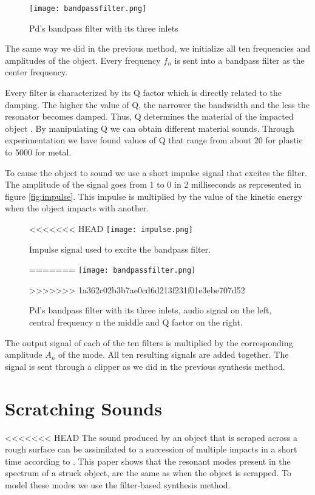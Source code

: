 \begin{figure}[H]
  \centering
    \texttt{[image: bandpassfilter.png]}
      \caption{Pd's bandpass filter with its three inlets}
      \label{fig:pdbandpass}
\end{figure} 

The same way we did in the previous method, we initialize all ten frequencies and amplitudes of the object. Every frequency $f_n$ is sent into a bandpass filter as the center frequency. 

Every filter is characterized by its Q factor which is directly related to the damping. The higher the value of Q, the narrower the bandwidth and the less the resonator becomes damped. Thus, Q determines the material of the impacted object \cite{gaver1993we}. By manipulating Q we can obtain different material sounds. Through experimentation we have found values of Q that range from about 20 for plastic to 5000 for metal. 

To cause the object to sound we use a short impulse signal that excites the filter. The amplitude of the signal goes from 1 to 0 in 2 milliseconds as represented in figure \ref{fig:impulse}. This impulse is multiplied by the value of the kinetic energy when the object impacts with another. 

\begin{figure}[H]
  \centering
<<<<<<< HEAD
    \texttt{[image: impulse.png]}
      \caption{Impulse signal used to excite the bandpass filter.}
      \label{fig:impulse}
=======
    \texttt{[image: bandpassfilter.png]}
      \caption{Pd's bandpass filter with its three inlets, audio signal on the left, central frequency n the middle and Q factor on the right.}
      \label{fig:bpf}
>>>>>>> 1a362c02b3b7ae0cd6d213f231f01e3ebe707d52
\end{figure} 

The output signal of each of the ten filters is multiplied by the corresponding amplitude $A_n$ of the mode. All ten resulting signals are added together. The signal is sent through a clipper as we did in the previous synthesis method.

\section{Scratching Sounds}

<<<<<<< HEAD
The sound produced by an object that is scraped across a rough surface can be assimilated to a succession of multiple impacts in a short time according to \cite{gaver1993we}. This paper shows that the resonant modes present in the spectrum of a struck object, are the same as when the object is scrapped. To model these modes we use the filter-based synthesis method.

